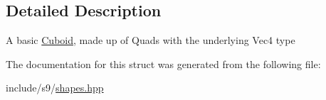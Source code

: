 \subsection{\-Detailed \-Description}
\-A basic \hyperlink{classs9_1_1Cuboid}{\-Cuboid}, made up of \-Quads with the underlying \-Vec4 type 

\-The documentation for this struct was generated from the following file\-:\begin{DoxyCompactItemize}
\item 
include/s9/\hyperlink{shapes_8hpp}{shapes.\-hpp}\end{DoxyCompactItemize}
